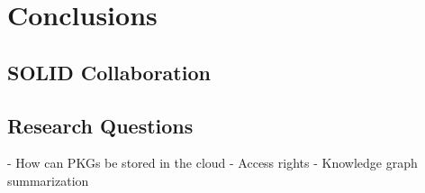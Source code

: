 \chapter{Conclusions}

\section{SOLID Collaboration}

\section{Research Questions}

- How can PKGs be stored in the cloud
- Access rights
- Knowledge graph summarization